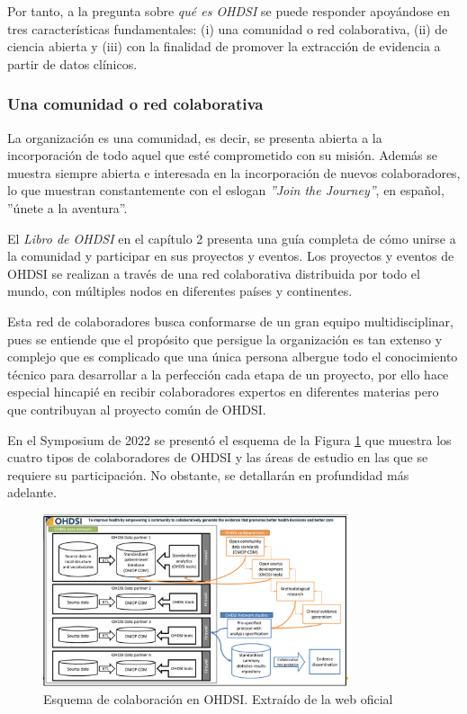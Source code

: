 Por tanto, a la pregunta sobre \textit{qué es OHDSI} se puede responder apoyándose en tres características fundamentales: (i)  una comunidad o red colaborativa, (ii) de ciencia abierta y (iii) con la finalidad de promover la extracción de evidencia a partir de datos clínicos.

\subsubsection{Una comunidad o red colaborativa}

La organización es una comunidad, es decir, se presenta abierta a la incorporación de todo aquel que esté comprometido con su misión. Además se muestra siempre abierta e interesada en la incorporación de nuevos colaboradores, lo que muestran constantemente con el eslogan \textit{''Join the Journey''}, en español, ''únete a la aventura''. 

El \textit{Libro de OHDSI} en el capítulo 2 presenta una guía completa de cómo unirse a la comunidad y participar en sus proyectos y eventos. Los proyectos y eventos de OHDSI se realizan a través de una red colaborativa distribuida por todo el mundo, con múltiples nodos en diferentes países y continentes.

Esta red de colaboradores busca conformarse de un gran equipo multidisciplinar, pues se entiende que el propósito que persigue la organización es tan extenso y complejo que es complicado que una única persona albergue todo el conocimiento técnico para desarrollar a la perfección cada etapa de un proyecto, por ello hace especial hincapié en recibir colaboradores expertos en diferentes materias pero que contribuyan al proyecto común de OHDSI.

En el Symposium de 2022 se presentó el esquema de la Figura \ref{fig:collaboratorsSchema} que muestra los cuatro tipos de colaboradores de OHDSI y las áreas de estudio en las que se requiere su participación. No obstante, se detallarán en profundidad más adelante.

\begin{figure}[H]
    \centering
    \includegraphics[width=0.80\textwidth]{figures/collaboratorsSchema.png}
    \caption{Esquema de colaboración en OHDSI. Extraído de la web oficial \cite{OHDSIwebsite}}
    \label{fig:collaboratorsSchema}
\end{figure}


